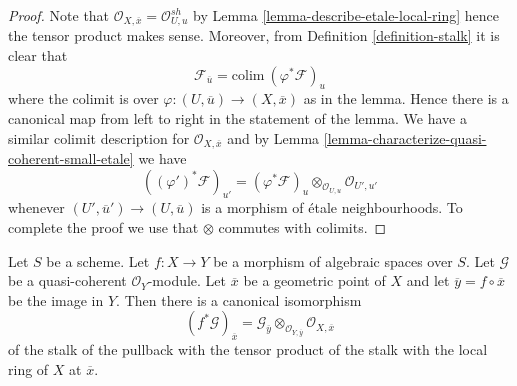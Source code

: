 \begin{proof}
Note that $\mathcal{O}_{X, \overline{x}} = \mathcal{O}_{U, u}^{sh}$ by
Lemma \ref{lemma-describe-etale-local-ring}
hence the tensor product makes sense. Moreover, from
Definition \ref{definition-stalk}
it is clear that
$$
\mathcal{F}_{\overline{u}} = \text{colim}\ (\varphi^*\mathcal{F})_u
$$
where the colimit is over $\varphi : (U, \overline{u}) \to (X, \overline{x})$
as in the lemma. Hence there is a canonical map from left to right in
the statement of the lemma. We have a similar colimit description for
$\mathcal{O}_{X, \overline{x}}$
and by
Lemma \ref{lemma-characterize-quasi-coherent-small-etale}
we have
$$
((\varphi')^*\mathcal{F})_{u'} =
(\varphi^*\mathcal{F})_u \otimes_{\mathcal{O}_{U, u}} \mathcal{O}_{U', u'}
$$
whenever $(U', \overline{u}') \to (U, \overline{u})$ is a morphism of
\'etale neighbourhoods. To complete the proof we use that
$\otimes$ commutes with colimits.
\end{proof}

\begin{lemma}
\label{lemma-stalk-pullback-quasi-coherent}
Let $S$ be a scheme. Let $f : X \to Y$ be a morphism of algebraic spaces
over $S$. Let $\mathcal{G}$ be a quasi-coherent $\mathcal{O}_Y$-module.
Let $\overline{x}$ be a geometric point of $X$ and let
$\overline{y} = f \circ \overline{x}$ be the image in $Y$.
Then there is a canonical isomorphism
$$
(f^*\mathcal{G})_{\overline{x}} =
\mathcal{G}_{\overline{y}} \otimes_{\mathcal{O}_{Y, \overline{y}}}
\mathcal{O}_{X, \overline{x}}
$$
of the stalk of the pullback with the tensor product of the stalk
with the local ring of $X$ at $\overline{x}$.
\end{lemma}

